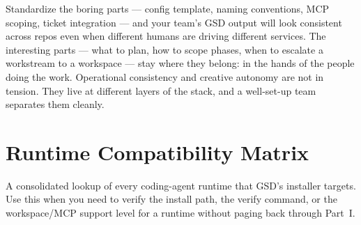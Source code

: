 \documentclass[11pt,letterpaper,openany]{book}
\begin{document}
\begin{gsdsuccess}
Standardize the boring parts --- config template, naming
conventions, MCP scoping, ticket integration --- and your team's
GSD output will look consistent across repos even when different
humans are driving different services. The interesting parts ---
what to plan, how to scope phases, when to escalate a workstream
to a workspace --- stay where they belong: in the hands of the
people doing the work. Operational consistency and creative
autonomy are not in tension. They live at different layers of the
stack, and a well-set-up team separates them cleanly.
\end{gsdsuccess}

\appendix

\chapter{Runtime Compatibility Matrix}
\label{app:runtime-matrix}

A consolidated lookup of every coding-agent runtime that GSD's installer
targets. Use this when you need to verify the install path, the verify
command, or the workspace/MCP support level for a runtime without paging
back through Part~I.
\end{document}
